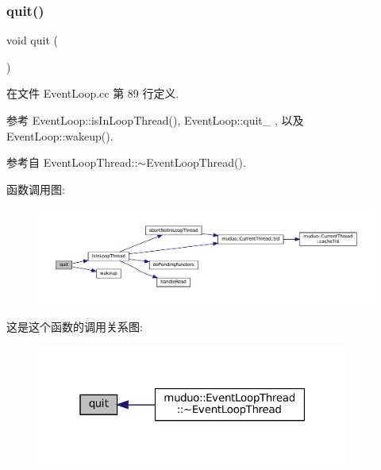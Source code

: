 \subsubsection{\texorpdfstring{quit()}{quit()}}
{\footnotesize\ttfamily void quit (\begin{DoxyParamCaption}{ }\end{DoxyParamCaption})}



在文件 Event\+Loop.\+cc 第 89 行定义.



参考 Event\+Loop\+::is\+In\+Loop\+Thread(), Event\+Loop\+::quit\+\_\+ , 以及 Event\+Loop\+::wakeup().



参考自 Event\+Loop\+Thread\+::$\sim$\+Event\+Loop\+Thread().

函数调用图\+:
\nopagebreak
\begin{figure}[H]
\begin{center}
\leavevmode
\includegraphics[width=350pt]{classmuduo_1_1EventLoop_a2463a3acef2df4c951ce942a3229e44e_cgraph}
\end{center}
\end{figure}
这是这个函数的调用关系图\+:
\nopagebreak
\begin{figure}[H]
\begin{center}
\leavevmode
\includegraphics[width=292pt]{classmuduo_1_1EventLoop_a2463a3acef2df4c951ce942a3229e44e_icgraph}
\end{center}
\end{figure}
\mbox{\label{classmuduo_1_1EventLoop_ab10f76c92cb5269f8296e5b3e4dd0ef9}} 
